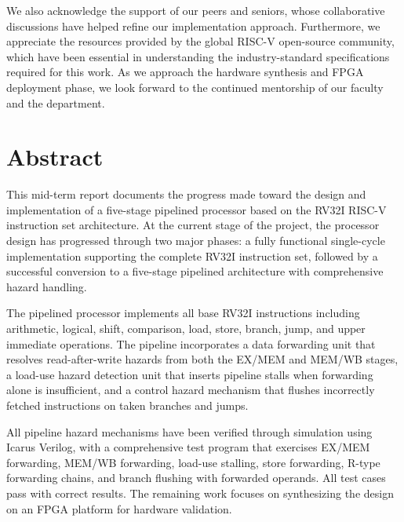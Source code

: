 \documentclass[12pt,a4paper]{report}
\begin{document}
We also acknowledge the support of our peers and seniors, whose collaborative
discussions have helped refine our implementation approach. Furthermore, we appreciate
the resources provided by the global RISC-V open-source community, which have been
essential in understanding the industry-standard specifications required for this work.
As we approach the hardware synthesis and FPGA deployment phase, we look forward to
the continued mentorship of our faculty and the department.

\chapter*{Abstract}

This mid-term report documents the progress made toward the design and implementation
of a five-stage pipelined processor based on the RV32I RISC-V instruction set
architecture. At the current stage of the project, the processor design has progressed
through two major phases: a fully functional single-cycle implementation supporting
the complete RV32I instruction set, followed by a successful conversion to a five-stage
pipelined architecture with comprehensive hazard handling.

The pipelined processor implements all base RV32I instructions including arithmetic,
logical, shift, comparison, load, store, branch, jump, and upper immediate operations.
The pipeline incorporates a data forwarding unit that resolves read-after-write hazards
from both the EX/MEM and MEM/WB stages, a load-use hazard detection unit that inserts
pipeline stalls when forwarding alone is insufficient, and a control hazard mechanism
that flushes incorrectly fetched instructions on taken branches and jumps.

All pipeline hazard mechanisms have been verified through simulation using Icarus
Verilog, with a comprehensive test program that exercises EX/MEM forwarding, MEM/WB
forwarding, load-use stalling, store forwarding, R-type forwarding chains, and branch
flushing with forwarded operands. All test cases pass with correct results. The
remaining work focuses on synthesizing the design on an FPGA platform for hardware
validation.

\tableofcontents
{}
\listoffigures
{}
\listoftables

\end{document}
